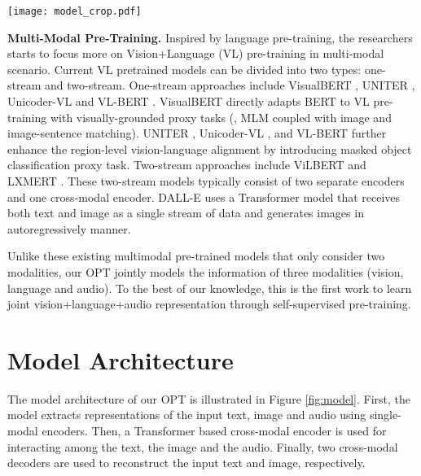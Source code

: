 \documentclass[10pt,twocolumn,letterpaper]{article}
\begin{document}
\begin{figure*}[t]
\begin{center}
\texttt{[image: model\_crop.pdf]}
\end{center}
  \caption{Model architecture of the proposed OPT, consisting of three single-modal encoders, a cross-modal encoder and two cross-modal decoders. We propose three levels of pre-training tasks: (1) token-level modeling, including masked language modeling (MLM), masked vision modeling (MVM), and masked audio modeling (MAM); (2) modality-level modeling, including denoising text reconstruction and denoising image reconstruction; and (3) sample-level modeling, where ``$\surd$'' denotes the corresponding modalities are matching. We introduce two masking mechanisms: (1) token-level masking, in order for token-level modeling; and (2) modality-level masking, in order for modality-level modeling and enabling arbitrary number of input modalities.}
\label{fig:model}
\end{figure*}

\textbf{Multi-Modal Pre-Training.} Inspired by language pre-training, the researchers starts to focus more on Vision+Language (VL) pre-training in multi-modal scenario. Current VL pretrained models can be divided into two types: one-stream and two-stream. One-stream approaches include VisualBERT \cite{visualbert}, UNITER \cite{chen2019uniter}, Unicoder-VL \cite{unicoder} and VL-BERT \cite{su2019vl}. VisualBERT \cite{visualbert} directly adapts BERT to VL pre-training with visually-grounded proxy tasks (\eg, MLM coupled with image and image-sentence matching). UNITER \cite{chen2019uniter}, Unicoder-VL \cite{unicoder}, and VL-BERT \cite{su2019vl} further enhance the region-level vision-language alignment by introducing masked object classification proxy task. Two-stream approaches include ViLBERT \cite{lvilbert} and LXMERT \cite{tan2019lxmert}. These two-stream models typically consist of two separate encoders and one cross-modal encoder. DALL-E \cite{dalle} uses a Transformer model that receives both text and image as a single stream of data and generates images in autoregressively manner. 

Unlike these existing multimodal pre-trained models that only consider two modalities, our OPT jointly models the information of three modalities (\ie vision, language and audio). To the best of our knowledge, this is the first work to learn joint vision+language+audio representation through self-supervised pre-training. 

\section{Model Architecture}
The model architecture of our OPT is illustrated in Figure \ref{fig:model}. First, the model extracts representations of the input text, image and audio using single-modal encoders. Then, a Transformer based cross-modal encoder is used for interacting among the text, the image and the audio. Finally, two cross-modal decoders are used to reconstruct the input text and image, respectively.  
\end{document}
